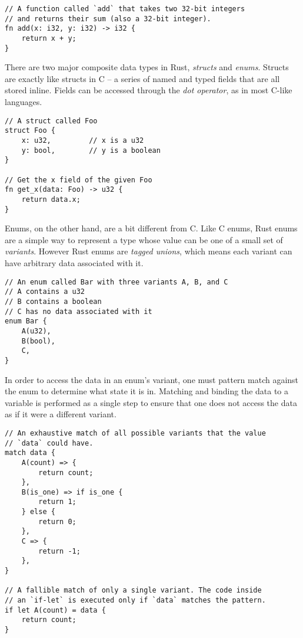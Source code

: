 \begin{verbatim}
// A function called `add` that takes two 32-bit integers
// and returns their sum (also a 32-bit integer).
fn add(x: i32, y: i32) -> i32 {
    return x + y;
}
\end{verbatim}

There are two major composite data types in Rust, \emph{structs} and \emph{enums}.
Structs are exactly like structs in C -- a series of named and typed fields that
are all stored inline. Fields can be accessed through the \emph{dot operator},
as in most C-like languages.

\begin{verbatim}
// A struct called Foo
struct Foo {
    x: u32,         // x is a u32
    y: bool,        // y is a boolean
}

// Get the x field of the given Foo
fn get_x(data: Foo) -> u32 {
    return data.x;
}
\end{verbatim}

Enums, on the other hand, are a bit different from C.
Like C enums, Rust enums are a simple way to represent a type whose value can be
one of a small set of \emph{variants}. However Rust enums are
\emph{tagged unions}, which means each variant can have arbitrary data associated
with it.

\begin{verbatim}
// An enum called Bar with three variants A, B, and C
// A contains a u32
// B contains a boolean
// C has no data associated with it
enum Bar {
    A(u32),
    B(bool),
    C,
}
\end{verbatim}

In order to access the data in an enum's variant, one must pattern match against
the enum to determine what state it is in. Matching and binding the data to a variable
is performed as a single step to ensure that one does not access the data as if it
were a different variant.

\begin{verbatim}
// An exhaustive match of all possible variants that the value
// `data` could have.
match data {
    A(count) => {
        return count;
    },
    B(is_one) => if is_one {
        return 1;
    } else {
        return 0;
    },
    C => {
        return -1;
    },
}

// A fallible match of only a single variant. The code inside
// an `if-let` is executed only if `data` matches the pattern.
if let A(count) = data {
    return count;
}
\end{verbatim}

